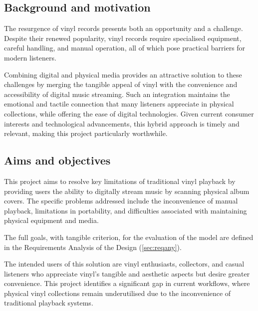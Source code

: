     
        \subsection{Background and motivation}
    
           The resurgence of vinyl records presents both an opportunity and a challenge. Despite their renewed popularity, vinyl records require specialised equipment, careful handling, and manual operation, all of which pose practical barriers for modern listeners.
    
            Combining digital and physical media provides an attractive solution to these challenges by merging the tangible appeal of vinyl with the convenience and accessibility of digital music streaming. Such an integration maintains the emotional and tactile connection that many listeners appreciate in physical collections, while offering the ease of digital technologies. Given current consumer interests and technological advancements, this hybrid approach is timely and relevant, making this project particularly worthwhile.
        
        \subsection{Aims and objectives}
    
            This project aims to resolve key limitations of traditional vinyl playback by providing users the ability to digitally stream music by scanning physical album covers. The specific problems addressed include the inconvenience of manual playback, limitations in portability, and difficulties associated with maintaining physical equipment and media.
    
            The full goals, with tangible criterion, for the evaluation of the model are defined in the Requirements Analysis of the Design (\ref{sec:reqany}).
    
            The intended users of this solution are vinyl enthusiasts, collectors, and casual listeners who appreciate vinyl's tangible and aesthetic aspects but desire greater convenience. This project identifies a significant gap in current workflows, where physical vinyl collections remain underutilised due to the inconvenience of traditional playback systems.
        
